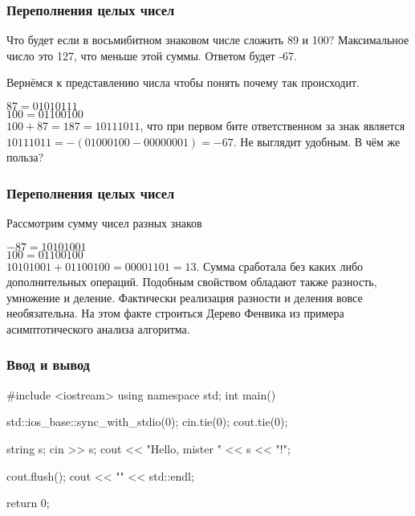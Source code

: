 
\begin{frame}
    \frametitle{Переполнения целых чисел}

    \quad Что будет если в восьмибитном знаковом числе сложить 89 и 100? Максимальное число это 127, что меньше этой суммы. Ответом будет -67.

    \quad Вернёмся к представлению числа чтобы понять почему так происходит.

    \quad $87 = 01010111$\\
    \quad $100 = 01100100$\\
    \quad $100 + 87 = 187 = 10111011$, что при первом бите ответственном за знак является $10111011 = -(01000100 - 00000001) = -67$. Не выглядит удобным. В чём же польза?

\end{frame}


\begin{frame}
    \frametitle{Переполнения целых чисел}

    \quad Рассмотрим сумму чисел разных знаков

    \quad $-87 = 10101001$\\
    \quad $100 = 01100100$\\
    \quad $10101001 + 01100100 = 00001101 = 13$. Сумма сработала без каких либо дополнительных операций. Подобным свойством обладают также разность, умножение и деление. Фактически реализация разности и деления вовсе необязательна. На этом факте строиться Дерево Фенвика из примера асимптотического анализа алгоритма.

\end{frame}


\begin{frame}[fragile]
    \frametitle{Ввод и вывод}

    \begin{cpp}
        #include <iostream>
        using namespace std;
        int main(){
            std::ios_base::sync_with_stdio(0);
            cin.tie(0);
            cout.tie(0);

            string s;
            cin >> s;
            cout << "Hello, mister " << s << "!";

            cout.flush();
            cout << "\n" << std::endl;
            
            return 0;
        }
    \end{cpp}
\end{frame}

